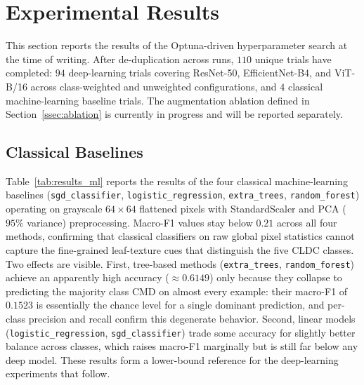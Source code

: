 \documentclass[conference]{IEEEtran}
\begin{document}
\section{Experimental Results}
\label{sec:results}

This section reports the results of the Optuna-driven hyperparameter search at the time of writing. After de-duplication across runs, $110$ unique trials have completed: $94$ deep-learning trials covering ResNet-50, EfficientNet-B4, and ViT-B/16 across class-weighted and unweighted configurations, and $4$ classical machine-learning baseline trials. The augmentation ablation defined in Section~\ref{ssec:ablation} is currently in progress and will be reported separately.

\subsection{Classical Baselines}
Table~\ref{tab:results_ml} reports the results of the four classical machine-learning baselines (\texttt{sgd\_classifier}, \texttt{logistic\_regression}, \texttt{extra\_trees}, \texttt{random\_forest}) operating on grayscale $64{\times}64$ flattened pixels with StandardScaler and PCA ($95\%$ variance) preprocessing. Macro-F1 values stay below $0.21$ across all four methods, confirming that classical classifiers on raw global pixel statistics cannot capture the fine-grained leaf-texture cues that distinguish the five CLDC classes. Two effects are visible. First, tree-based methods (\texttt{extra\_trees}, \texttt{random\_forest}) achieve an apparently high accuracy ($\approx 0.6149$) only because they collapse to predicting the majority class CMD on almost every example: their macro-F1 of $0.1523$ is essentially the chance level for a single dominant prediction, and per-class precision and recall confirm this degenerate behavior. Second, linear models (\texttt{logistic\_regression}, \texttt{sgd\_classifier}) trade some accuracy for slightly better balance across classes, which raises macro-F1 marginally but is still far below any deep model. These results form a lower-bound reference for the deep-learning experiments that follow.


\end{document}
